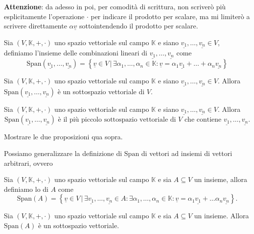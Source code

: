 \textbf{Attenzione}: da adesso in poi, per comodità di scrittura, non scriverò più esplicitamente l'operazione $\cdot$ per indicare il prodotto per scalare, ma mi limiterò a scrivere direttamente $\alpha \underline{v}$ sottointendendo il prodotto per scalare.
\begin{definition}
    Sia $(V, \mathbb{K}, +, \cdot)$ uno spazio vettoriale sul campo $\mathbb{K}$ e siano $\underline{v_1}, \ldots, \underline{v_n} \in V$, definiamo l'insieme delle combinazioni lineari di $\underline{v_1}, \ldots, \underline{v_n}$ come
    $$
        \text{Span}(\underline{v_1}, \ldots, \underline{v_n}) = \left\{ \underline{v} \in V \, \bigg| \, \exists \alpha_1, \ldots, \alpha_n \in \mathbb{K} : \underline{v} = \alpha_1 \underline{v_1} + \ldots + \alpha_n \underline{v_n} \right\}
    $$
\end{definition}
\begin{prop}
    Sia $(V, \mathbb{K}, +, \cdot)$ uno spazio vettoriale sul campo $\mathbb{K}$ e siano $\underline{v_1}, \ldots, \underline{v_n} \in V$. Allora $\text{Span}(\underline{v_1}, \ldots, \underline{v_n})$ è un sottospazio vettoriale di $V$.
\end{prop}
\begin{prop}
    Sia $(V, \mathbb{K}, +, \cdot)$ uno spazio vettoriale sul campo $\mathbb{K}$ e siano $\underline{v_1}, \ldots, \underline{v_n} \in V$. Allora
    $$
        \text{Span}(\underline{v_1}, \ldots, \underline{v_n}) \text{ è il più piccolo sottospazio vettoriale di } V \text{ che contiene } \underline{v_1}, \ldots, \underline{v_n}.
    $$
\end{prop}
\begin{exercise}
    \label{ex:1.2} Mostrare le due proposizioni qua sopra. 
\end{exercise}
Possiamo generalizzare la definizione di $\text{Span}$ di vettori ad insiemi di vettori arbitrari, ovvero
\begin{definition}
    Sia $(V, \mathbb{K}, +, \cdot)$ uno spazio vettoriale sul campo $\mathbb{K}$ e sia $A \subseteq V$ un insieme, allora definiamo lo  di $A$ come
    $$
        \text{Span}(A) = \left\{ \underline{v} \in V \, \bigg| \, \exists \underline{v_1}, \ldots, \underline{v_n} \in A : \exists \alpha_1, \ldots, \alpha_n \in \mathbb{K} : \underline{v} = \alpha_1 \underline{v_1} + \ldots \alpha_n \underline{v_n} \right\}.
    $$
\end{definition}
\begin{prop}
    Sia $(V, \mathbb{K}, +,\cdot)$ uno spazio vettoriale sul campo $\mathbb{K}$ e sia $A \subseteq V$ un insieme. Allora $\text{Span}(A)$ è un sottospazio vettoriale.
\end{prop}
